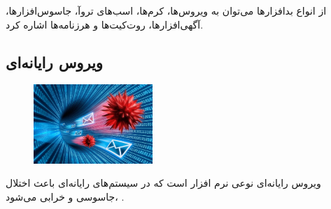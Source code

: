 \documentclass[12pt]{book}
\begin{document}
از انواع بدافزارها می‌توان به ویروس‌ها، کرم‌ها، اسب‌های تروآ، جاسوس‌افزارها، آگهی‌افزارها، روت‌کیت‌ها و هرزنامه‌ها اشاره کرد. 





\subsection{ویروس رایانه‌ای}


\begin{figure}
  \vspace{-20pt}
  \begin{center}
    \includegraphics[width=0.4\textwidth]{./computer-virus-1024x683.jpg}
  \end{center}
  \vspace{-20pt}
  \caption{}
  \vspace{-10pt}
\end{figure}

ویروس رایانه‌ای 
 نوعی نرم افزار 
  است که در سیستم‌های رایانه‌ای باعث اختلال ،جاسوسی و خرابی می‌شود . 
\end{document}
